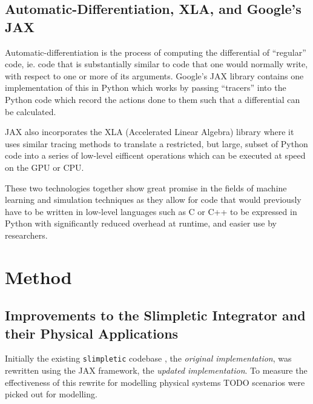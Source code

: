 \documentclass[10pt]{iopart}
\def\SI{Slimpletic Integrator}
\begin{document}
\subsection{Automatic-Differentiation, XLA, and Google's JAX}

Automatic-differentiation is the process of computing the differential of \enquote{regular} code, ie. code that is substantially similar to code that one would normally write, with respect to one or more of its arguments. Google's JAX library \cite{jax2018github} contains one implementation of this in Python which works by passing \enquote{tracers} into the Python code which record the actions done to them such that a differential can be calculated.

JAX also incorporates the XLA (Accelerated Linear Algebra) library \cite{openxla-xla} where it uses similar tracing methods to translate a restricted, but large, subset of Python code into a series of low-level eifficent operations which can be executed at speed on the GPU or CPU.

These two technologies together show great promise in the fields of machine learning and simulation techniques as they allow for code that would previously have to be written in low-level languages such as C or C++ to be expressed in Python with significantly reduced overhead at runtime, and easier use by researchers.

\section{Method}

\subsection{Improvements to the \SI{} and their Physical Applications}


\newcommand{\orgimpl}{\textit{original implementation}}
\newcommand{\updimpl}{\textit{updated implementation}}

Initially the existing \texttt{slimpletic} codebase \cite{originalCode}, the \orgimpl{}, was rewritten using the JAX framework, the \updimpl{}. To measure the effectiveness of this rewrite for modelling physical systems TODO scenarios were picked out for modelling.
\end{document}
